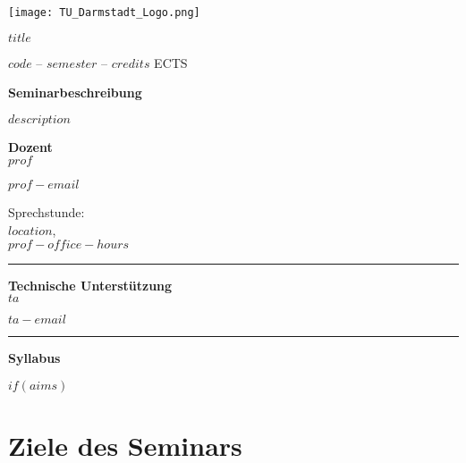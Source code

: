 \documentclass[11pt,a4paper]{article}
\author{$prof$}
\begin{document}
\hspace*{-1.25cm}
\texttt{[image: TU\_Darmstadt\_Logo.png]}
\vspace{0.25cm}

\begin{minipage}[t][98mm][t]{0.5\textwidth}

\textbf{\textcolor{TUColor}{$title$}}

$code$ -- $semester$ -- $credits$ ECTS
\vspace{0.25cm}

\textbf{\textcolor{TUColor}{Seminarbeschreibung}}

$description$

\vspace{0.25cm}

\fontsize{8}{10}{\textbf{\textcolor{TUColor}{$program$}}}

\vspace{0.25cm}
	\end{minipage}%
	\hspace{0.5cm}\vrule{}\hspace{0.5cm}
	\begin{minipage}[t][95mm][t]{0.4\textwidth}
	\begin{minipage}[t][37mm][t]{\textwidth}
	\textbf{Dozent}\\
	
	$prof$
	
	\vspace{0.1cm}
	$prof-email$
	\vspace{0.1cm}
	
Sprechstunde: \\
$location$,\\
$prof-office-hours$
	
	\end{minipage}
	\vspace{1cm}\hrule{}\vspace{0.5cm}
	\begin{minipage}[t][38mm][t]{\textwidth}
	\textbf{Technische Unterstützung}\\
	
	$ta$

	\vspace{0.1cm}
	$ta-email$

	\end{minipage}
	\end{minipage}
	\hrule{}
	
\textbf{\textcolor{TUColor}{Syllabus}}	

$if(aims)$\section*{Ziele des Seminars}
\end{document}
